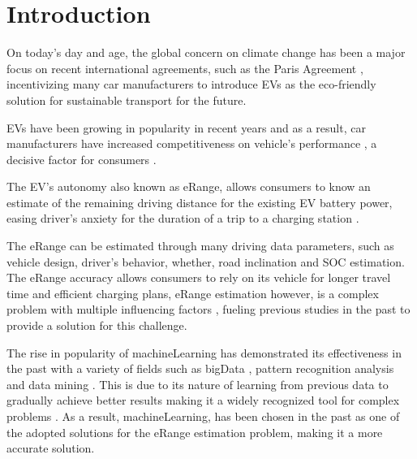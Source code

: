 \chapter{Introduction}
\label{cha:introduction}

On today's day and age, the global concern on climate
change has been a major focus on recent international agreements,
such as the Paris Agreement \citep{parisAgreement},
incentivizing many car manufacturers to introduce
\gls{EVs} as the eco-friendly
solution for sustainable transport for the future.

\gls{EVs} have been growing in popularity in
recent years and as a result, car manufacturers have
increased competitiveness on vehicle's performance
\citep{evCompetitiveness}, a decisive factor 
for consumers \citep{EGBUE2012717}.

The \gls{EV}'s autonomy also known as \gls{eRange},
allows consumers to know an estimate of the
remaining driving distance for the existing \gls{EV}
battery power, easing driver's anxiety for the duration
of a trip to a charging station \citep{eRangeFactors, driverAnxiety}.

The \gls{eRange} can be estimated through many
driving data parameters,
such as vehicle design, driver's behavior, whether,
road inclination and \gls{SOC} estimation.
The \gls{eRange} accuracy allows consumers to rely
on its vehicle for longer travel time and efficient
charging plans, \gls{eRange} estimation
however, is a complex problem with multiple influencing
factors \citep{predictionOfeRange}, fueling previous
studies in the past to provide a solution for this challenge.

The rise in popularity of \gls{machineLearning}
\citep{machineLearningCaseStudy}
has demonstrated its effectiveness in the
past with a variety of fields such as \gls{bigData}
\citep{machineLearningBigData, machineLearningBigData2},
pattern recognition analysis and data mining
\citep{businessDataMining}.  
This is due to its nature of learning 
from previous data to gradually achieve
better results making it a widely 
recognized tool for complex problems 
\citep{mitchelllearning}.
As a result, \gls{machineLearning}, 
has been chosen in the past 
as one of the adopted solutions for 
the \gls{eRange} estimation problem,
making it a more accurate solution.  

